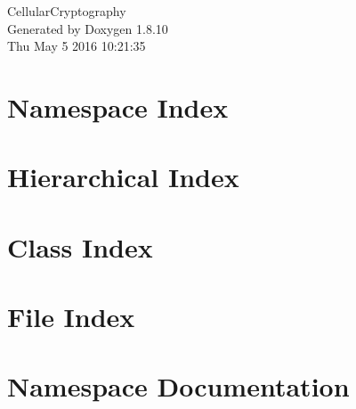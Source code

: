 \documentclass[twoside]{book}
\newcommand{\+}{\discretionary{\mbox{\scriptsize$\hookleftarrow$}}{}{}}
\newcommand{\clearemptydoublepage}{%
  \newpage{\pagestyle{empty}\cleardoublepage}%
}
\begin{document}
\hypersetup{pageanchor=false,
             bookmarks=true,
             bookmarksnumbered=true,
             pdfencoding=unicode
            }
\begin{titlepage}
\vspace*{7cm}
\begin{center}%
{\Large Cellular\+Cryptography }\\
\vspace*{1cm}
{\large Generated by Doxygen 1.8.10}\\
\vspace*{0.5cm}
{\small Thu May 5 2016 10:21:35}\\
\end{center}
\end{titlepage}
\clearemptydoublepage
\tableofcontents
\clearemptydoublepage
{}
\hypersetup{pageanchor=true}

\chapter{Namespace Index}

\chapter{Hierarchical Index}

\chapter{Class Index}

\chapter{File Index}

\chapter{Namespace Documentation}







\end{document}
